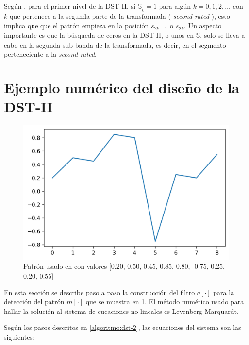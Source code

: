 Según \cite{Guido2018}, para el primer nivel de la DST-II, si $\mathbb{S}_{_k}=1$ para algún $k=0,1,2,\ldots$
con $k$ que pertenece a la segunda parte de la transformada ( \textit{second-rated} ), esto implica que 
que el patrón empieza en la posición $s_{2k-1}$ o $s_{2k}$. Un aspecto importante es que la búsqueda de 
ceros en la DST-II, o unos en $\mathbb{S}$, solo se lleva a cabo en la segunda sub-banda de la transformada,
es decir, en el segmento perteneciente a la \textit{second-rated}.

\section{Ejemplo numérico del diseño de la DST-II}

\begin{figure} 
	\centering
	\includegraphics[scale=0.8]{Graphics/guido20118-pattern.png}
	\caption{Patrón usado en \cite{Guido2018} con valores [0.20, 0.50, 0.45, 0.85, 0.80, -0.75, 0.25, 0.20, 0.55]} \label{fig:Guido2018-pattern}
\end{figure}

En esta sección se describe paso a paso la construcción del filtro $q[\cdot]$ para la detección del
patrón $m[\cdot]$ que se muestra en \ref{fig:Guido2018-pattern}. El método numérico usado para hallar
la solución al sistema de eucaciones no lineales es Levenberg-Marquardt.

Según los pasos descritos en \ref{algoritmo:dst-2}, las ecuaciones del sistema son las siguientes:

